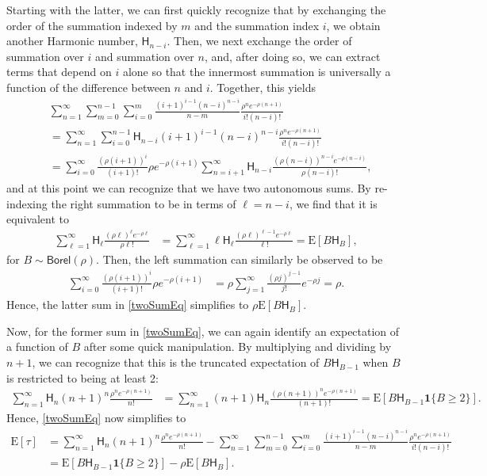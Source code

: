 \documentclass[stsy,dblanonrev]{amers/INFORMS-STSY-Template-26-02-2026/informs4}
\newcommand{\E}[1]{{\mathrm{E}\left[#1\right]}}
\begin{document}
Starting with the latter, we can first quickly recognize that by exchanging the order of the summation indexed by $m$ and the summation index $i$, we obtain another Harmonic number, $\mathsf{H}_{n-i}$. Then, we next exchange the order of summation over $i$ and summation over $n$, and, after doing so, we can extract terms that depend on $i$ alone so that the innermost summation is universally a function of the difference between $n$ and $i$. Together, this yields
\begin{align}
&\sum_{n=1}^\infty
\sum_{m=0}^{n-1}
\sum_{i=0}^m
\frac{\left({i+1}\right)^{i-1}
\left({n-i}\right)^{n-i}}{n-m}
 \frac{\rho^n e^{-\rho(n+1)}}{i!(n-i)!}
 \nonumber\\
 &=
 \sum_{n=1}^\infty
\sum_{i=0}^{n-1}
\mathsf{H}_{n-i}
\left({i+1}\right)^{i-1}
\left({n-i}\right)^{n-i}
 \frac{\rho^n e^{-\rho(n+1)}}{i!(n-i)!}
 \\
  &=
 \sum_{i=0}^\infty
 \frac{\left(\rho({i+1})\right)^{i} }{(i+1)!}
 \rho e^{-\rho(i+1)}
\sum_{n=i+1}^{\infty}
\mathsf{H}_{n-i}
 \frac{\left(\rho(n-i)\right)^{n-i} e^{-\rho(n-i)}}{\rho(n-i)!}
 ,
\end{align}
and at this point we can recognize that we have two autonomous sums. By re-indexing the right summation to be in terms of $\ell = n - i$, we find that it is equivalent to
\begin{align}
\sum_{\ell=1}^{\infty}
\mathsf{H}_{\ell}
 \frac{\left(\rho\ell\right)^{\ell} e^{-\rho\ell}}{\rho \ell!}
 &=
 \sum_{\ell=1}^{\infty}
\ell \mathsf{H}_{\ell}
 \frac{\left(\rho\ell\right)^{\ell-1} e^{-\rho\ell}}{ \ell!}
 =
 \E{B \mathsf{H}_B}
 ,
\end{align}
for $B \sim \mathsf{Borel}(\rho)$. Then, the left summation can similarly be observed to be 
\begin{align}
 \sum_{i=0}^\infty
 \frac{\left(\rho({i+1})\right)^{i} }{(i+1)!}
 \rho e^{-\rho(i+1)}
 &=
 \rho
  \sum_{j=1}^\infty
 \frac{\left(\rho j\right)^{j-1} }{j!}
 e^{-\rho j}
 =
 \rho
 .
\end{align}
Hence, the latter sum in \eqref{twoSumEq} simplifies to $\rho \E{B \mathsf{H}_B}$.

Now, for the former sum in \eqref{twoSumEq}, we can again identify an expectation of a function of $B$ after some quick manipulation. By multiplying and dividing by $n+1$, we can recognize that this is the truncated expectation of $B \mathsf{H}_{B-1}$ when $B$ is restricted to being at least 2:
\begin{align}
\sum_{n=1}^\infty 
\mathsf{H}_n (n+1)^{n} \frac{\rho^n e^{-\rho(n+1)}}{n!}
&=
\sum_{n=1}^\infty 
(n+1)\mathsf{H}_n  \frac{\left(\rho(n+1)\right)^n e^{-\rho(n+1)}}{(n+1)!}
=
\E{B \mathsf{H}_{B-1} \mathbf{1}\{B \geq 2\}}
.
\end{align}
Hence, \eqref{twoSumEq} now simplifies to
\begin{align}
\E{\tau}
&=
\sum_{n=1}^\infty 
\mathsf{H}_n (n+1)^{n} \frac{\rho^n e^{-\rho(n+1)}}{n!}
-
\sum_{n=1}^\infty
\sum_{m=0}^{n-1}
\sum_{i=0}^m
\frac{\left({i+1}\right)^{i-1}
\left({n-i}\right)^{n-i}}{n-m}
 \frac{\rho^n e^{-\rho(n+1)}}{i!(n-i)!}
\\
&=
\E{B \mathsf{H}_{B-1} \mathbf{1}\{B \geq 2\}}
-
\rho \E{B \mathsf{H}_{B}}
.
\end{align}
\end{document}
